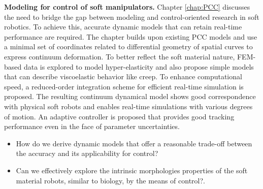 \noindent \textbf{Modeling for control of soft manipulators.} Chapter \ref{chap:PCC} discusses the need to bridge the gap between modeling and control-oriented research in soft robotics. To achieve this, accurate dynamic models that can retain real-time performance are required. The chapter builds upon existing PCC models and use a minimal set of coordinates related to differential geometry of spatial curves to express continuum deformation. To better reflect the soft material nature,  FEM-based data is explored to model hyper-elasticity and also propose simple models that can describe viscoelastic behavior like creep. To enhance computational speed, a reduced-order integration scheme for efficient real-time simulation is proposed. The resulting continuum dynamical model shows good correspondence with physical soft robots and enables real-time simulations with various degrees of motion. An adaptive controller is proposed that provides good tracking performance even in the face of parameter uncertainties. 

\begin{itemize}
  \setlength\itemsep{-.1em}
  \item {How do we derive dynamic models that offer a reasonable trade-off between the accuracy and its applicability for control?}
  \item {Can we effectively explore the intrinsic morphologies properties of the soft material robots, similar to biology, by the means of control?}.
\end{itemize}

